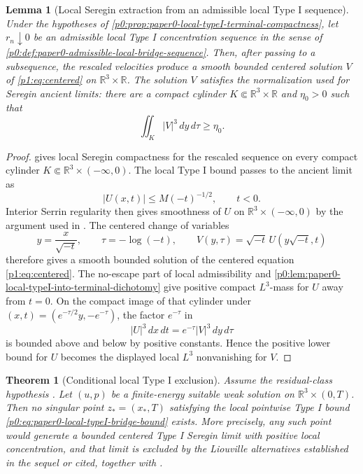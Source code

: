 \documentclass[11pt]{amsart}
\theoremstyle{plain}
\newtheorem{theorem}{Theorem}[section]
\newtheorem{lemma}[lemma]{Lemma}
\theoremstyle{definition}
\theoremstyle{remark}
\numberwithin{equation}{section}
\begin{document}
\begin{lemma}[Local Seregin extraction from an admissible local Type I sequence]
\label{p0:lem:local-seregin-extraction}
Under the hypotheses of
\cref{p0:prop:paper0-local-typeI-terminal-compactness}, let \(r_n\downarrow0\)
be an admissible local Type I concentration sequence in the sense of
\cref{p0:def:paper0-admissible-local-bridge-sequence}.  Then, after passing to
a subsequence, the rescaled velocities produce a smooth bounded centered
solution \(V\) of \eqref{p1:eq:centered} on
\(\mathbb R^3\times\mathbb R\).  The solution \(V\) satisfies the
normalization used for Seregin ancient limits: there are a compact cylinder
\(K\Subset\mathbb R^3\times\mathbb R\) and \(\eta_0>0\) such that
\[
   \iint_K |V|^3\,dy\,d\tau\ge\eta_0 .
\]
\end{lemma}

\begin{proof}
 gives local Seregin
compactness for the rescaled sequence on every compact cylinder
\(K\Subset\mathbb R^3\times(-\infty,0)\).  The local Type I bound passes to
the ancient limit as
\[
   |U(x,t)|\le M(-t)^{-1/2},\qquad t<0.
\]
Interior Serrin regularity then gives smoothness of \(U\) on
\(\mathbb R^3\times(-\infty,0)\) by the argument used in
.  The centered change of variables
\[
   y=\frac{x}{\sqrt{-t}},\qquad \tau=-\log(-t),\qquad
   V(y,\tau)=\sqrt{-t}\,U(y\sqrt{-t},t)
\]
therefore gives a smooth bounded solution of the centered equation
\eqref{p1:eq:centered}.  The no-escape part of local admissibility and
\cref{p0:lem:paper0-local-typeI-into-terminal-dichotomy} give positive
compact \(L^3\)-mass for \(U\) away from \(t=0\).  On the compact image of
that cylinder under \((x,t)=(e^{-\tau/2}y,-e^{-\tau})\), the factor
\(e^{-\tau}\) in
\[
   |U|^3\,dx\,dt=e^{-\tau}|V|^3\,dy\,d\tau
\]
is bounded above and below by positive constants.  Hence the positive lower
bound for \(U\) becomes the displayed local \(L^3\) nonvanishing for \(V\).
\end{proof}

\begin{theorem}[Conditional local Type I exclusion]
\label{p0:thm:local-typeI-exclusion}
Assume the residual-class hypothesis .
Let \((u,p)\) be a finite-energy suitable weak solution on
\(\mathbb R^3\times(0,T)\).  Then no singular point \(z_*=(x_*,T)\) satisfying
the local pointwise Type I bound \eqref{p0:eq:paper0-local-typeI-bridge-bound}
exists.  More precisely, any such point would generate a bounded centered Type I
Seregin limit with positive local concentration, and that limit is excluded
by the Liouville alternatives established in the sequel or cited, together with
.
\end{theorem}
\end{document}
